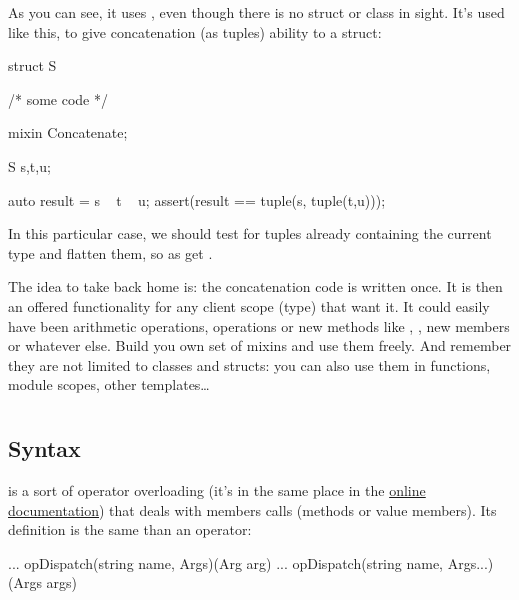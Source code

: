 As you can see, it uses , even though there is no struct or class in sight. It's used like this, to give concatenation (as tuples) ability to a struct:

\begin{dcode}
struct S
{
    /* some code */

    mixin Concatenate;
}

S s,t,u;

auto result = s ~ t ~ u;
assert(result == tuple(s, tuple(t,u)));
\end{dcode}

In this particular case, we should test for tuples already containing the current type and flatten them, so as get .

The idea to take back home is: the concatenation code is written once. It is then an offered functionality for any client scope (type) that want it. It could easily have been arithmetic operations,  operations or new methods like , , new members or whatever else. Build you own set of mixins and use them freely. And remember they are not limited to classes and structs: you can also use them in functions, module scopes, other templates\ldots


\section{} \label{opdispatch}

\subsection{Syntax}\label{opdispatchsyntax}

 is a sort of operator overloading (it's in the same place in the \href{www.dlang.org/operator.html}{online documentation}) that deals with members calls (methods or value members). Its definition is the same than an operator:

\begin{dcode}
... opDispatch(string name, Args)(Arg arg)
... opDispatch(string name, Args...)(Args args)
\end{dcode}

